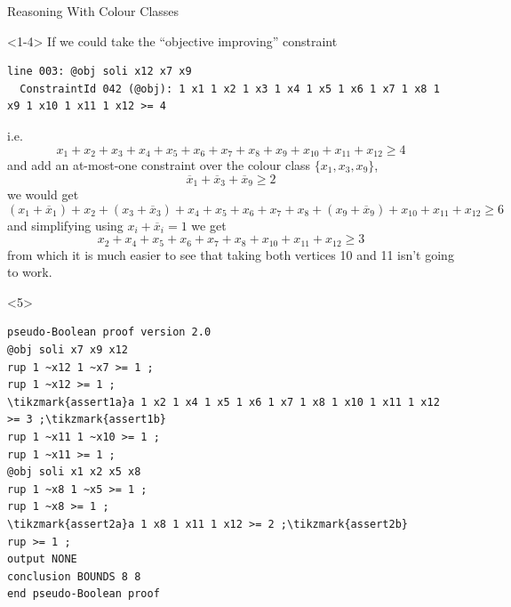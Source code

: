 \documentclass[aspectratio=169,compress,10pt]{beamer}
\begin{document}
\begin{frame}[fragile,t]{Reasoning With Colour Classes}%
\begin{onlyenv}<1-4>%
        If we could take the ``objective improving'' constraint
\begin{Verbatim}[commandchars=\\\{\},fontsize=\scriptsize]
line 003: @obj soli x12 x7 x9
  ConstraintId 042 (@obj): 1 x1 1 x2 1 x3 1 x4 1 x5 1 x6 1 x7 1 x8 1 x9 1 x10 1 x11 1 x12 >= 4
\end{Verbatim}
            i.e. \[
                x_1 + x_2 + x_3 + x_4 + x_5 + x_6 + x_7 + x_8 + x_9 + x_{10} + x_{11} + x_{12} \ge 4
            \]
            \pause
            and add an at-most-one constraint over the colour class $\{x_1, x_3, x_9\}$,
            \[\overline{x}_1 + \overline{x}_3 + \overline{x}_9 \ge 2\]
            \pause
we would get \[
    (x_1 + \overline{x}_1) + x_2 + (x_3 + \overline{x}_3) + x_4 + x_5 + x_6 + x_7 + x_8 + (x_9 +
            \overline{x}_9) + x_{10} + x_{11} + x_{12} \ge 6\]
        \pause
        and simplifying using $x_i + \overline{x}_i = 1$ we get \[
    x_2 + x_4 + x_5 + x_6 + x_7 + x_8 + x_{10} + x_{11} + x_{12} \ge 3\]
from which it is much easier to see that taking both vertices 10 and 11 isn't going to work.
\end{onlyenv}\begin{onlyenv}<5>%
%
%
\begin{Verbatim}[commandchars=\\\{\},codes={\catcode`$=3\catcode`^=7}]
pseudo-Boolean proof version 2.0
@obj soli x7 x9 x12
rup 1 ~x12 1 ~x7 >= 1 ;
rup 1 ~x12 >= 1 ;
\tikzmark{assert1a}a 1 x2 1 x4 1 x5 1 x6 1 x7 1 x8 1 x10 1 x11 1 x12 >= 3 ;\tikzmark{assert1b}
rup 1 ~x11 1 ~x10 >= 1 ;
rup 1 ~x11 >= 1 ;
@obj soli x1 x2 x5 x8
rup 1 ~x8 1 ~x5 >= 1 ;
rup 1 ~x8 >= 1 ;
\tikzmark{assert2a}a 1 x8 1 x11 1 x12 >= 2 ;\tikzmark{assert2b}
rup >= 1 ;
output NONE
conclusion BOUNDS 8 8
end pseudo-Boolean proof
\end{Verbatim}

\end{onlyenv}
\end{frame}
\end{document}
